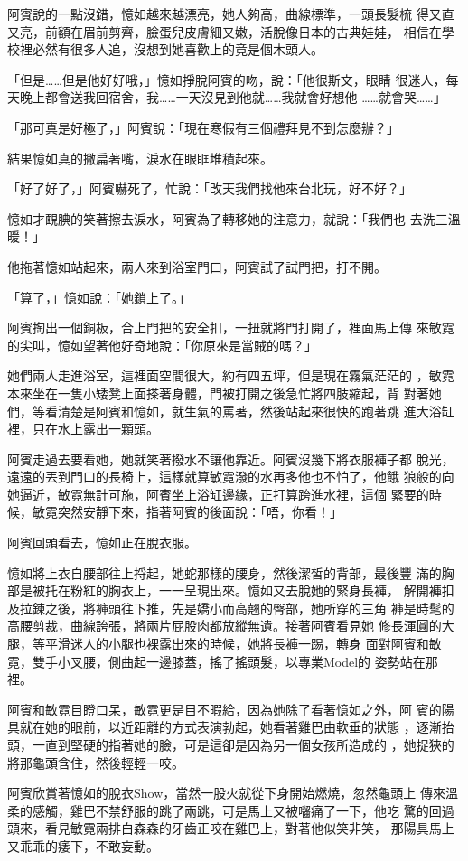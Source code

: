 阿賓說的一點沒錯，憶如越來越漂亮，她人夠高，曲線標準，一頭長髮梳
得又直又亮，前額在眉前剪齊，臉蛋兒皮膚細又嫩，活脫像日本的古典娃娃，
相信在學校裡必然有很多人追，沒想到她喜歡上的竟是個木頭人。

「但是……但是他好好哦，」憶如掙脫阿賓的吻，說：「他很斯文，眼睛
很迷人，每天晚上都會送我回宿舍，我……一天沒見到他就……我就會好想他
……就會哭……」

「那可真是好極了，」阿賓說：「現在寒假有三個禮拜見不到怎麼辦？」

結果憶如真的撇扁著嘴，淚水在眼眶堆積起來。

「好了好了，」阿賓嚇死了，忙說：「改天我們找他來台北玩，好不好？」

憶如才靦腆的笑著擦去淚水，阿賓為了轉移她的注意力，就說：「我們也
去洗三溫暖！」

他拖著憶如站起來，兩人來到浴室門口，阿賓試了試門把，打不開。

「算了，」憶如說：「她鎖上了。」

阿賓掏出一個銅板，合上門把的安全扣，一扭就將門打開了，裡面馬上傳
來敏霓的尖叫，憶如望著他好奇地說：「你原來是當賊的嗎？」

她們兩人走進浴室，這裡面空間很大，約有四五坪，但是現在霧氣茫茫的
，敏霓本來坐在一隻小矮凳上面搽著身體，門被打開之後急忙將四肢縮起，背
對著她們，等看清楚是阿賓和憶如，就生氣的罵著，然後站起來很快的跑著跳
進大浴缸裡，只在水上露出一顆頭。

阿賓走過去要看她，她就笑著撥水不讓他靠近。阿賓沒幾下將衣服褲子都
脫光，遠遠的丟到門口的長椅上，這樣就算敏霓潑的水再多他也不怕了，他餓
狼般的向她逼近，敏霓無計可施，阿賓坐上浴缸邊緣，正打算跨進水裡，這個
緊要的時候，敏霓突然安靜下來，指著阿賓的後面說：「唔，你看！」

阿賓回頭看去，憶如正在脫衣服。

憶如將上衣自腰部往上捋起，她蛇那樣的腰身，然後潔皙的背部，最後豐
滿的胸部是被托在粉紅的胸衣上，一一呈現出來。憶如又去脫她的緊身長褲，
解開褲扣及拉鍊之後，將褲頭往下推，先是嬌小而高翹的臀部，她所穿的三角
褲是時髦的高腰剪裁，曲線誇張，將兩片屁股肉都放縱無遺。接著阿賓看見她
修長渾圓的大腿，等平滑迷人的小腿也裸露出來的時候，她將長褲一踢，轉身
面對阿賓和敏霓，雙手小叉腰，側曲起一邊膝蓋，搖了搖頭髮，以專業Model的
姿勢站在那裡。

阿賓和敏霓目瞪口呆，敏霓更是目不暇給，因為她除了看著憶如之外，阿
賓的陽具就在她的眼前，以近距離的方式表演勃起，她看著雞巴由軟垂的狀態
，逐漸抬頭，一直到堅硬的指著她的臉，可是這卻是因為另一個女孩所造成的
，她捉狹的將那龜頭含住，然後輕輕一咬。

阿賓欣賞著憶如的脫衣Show，當然一股火就從下身開始燃燒，忽然龜頭上
傳來溫柔的感觸，雞巴不禁舒服的跳了兩跳，可是馬上又被囓痛了一下，他吃
驚的回過頭來，看見敏霓兩排白森森的牙齒正咬在雞巴上，對著他似笑非笑，
那陽具馬上又乖乖的痿下，不敢妄動。

